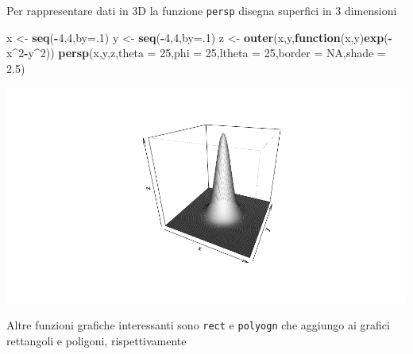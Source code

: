 \documentclass[
  11pt,
]{book}
\newenvironment{Shaded}{\begin{snugshade}}{\end{snugshade}}
\newcommand{\AttributeTok}[1]{\textcolor[rgb]{0.13,0.29,0.53}{#1}}
\newcommand{\ConstantTok}[1]{\textcolor[rgb]{0.56,0.35,0.01}{#1}}
\newcommand{\ControlFlowTok}[1]{\textcolor[rgb]{0.13,0.29,0.53}{\textbf{#1}}}
\newcommand{\DecValTok}[1]{\textcolor[rgb]{0.00,0.00,0.81}{#1}}
\newcommand{\FloatTok}[1]{\textcolor[rgb]{0.00,0.00,0.81}{#1}}
\newcommand{\FunctionTok}[1]{\textcolor[rgb]{0.13,0.29,0.53}{\textbf{#1}}}
\newcommand{\NormalTok}[1]{#1}
\newcommand{\OtherTok}[1]{\textcolor[rgb]{0.56,0.35,0.01}{#1}}
\newcommand{\SpecialCharTok}[1]{\textcolor[rgb]{0.81,0.36,0.00}{\textbf{#1}}}
\theoremstyle{mytheoremstyle}
\theoremstyle{mydefstyle}
\begin{document}
Per rappresentare dati in 3D la funzione \texttt{persp} disegna superfici in 3 dimensioni

\begin{Shaded}
\begin{Highlighting}[]
\NormalTok{x }\OtherTok{\textless{}{-}} \FunctionTok{seq}\NormalTok{(}\SpecialCharTok{{-}}\DecValTok{4}\NormalTok{,}\DecValTok{4}\NormalTok{,}\AttributeTok{by=}\NormalTok{.}\DecValTok{1}\NormalTok{)}
\NormalTok{y }\OtherTok{\textless{}{-}} \FunctionTok{seq}\NormalTok{(}\SpecialCharTok{{-}}\DecValTok{4}\NormalTok{,}\DecValTok{4}\NormalTok{,}\AttributeTok{by=}\NormalTok{.}\DecValTok{1}\NormalTok{)}
\NormalTok{z }\OtherTok{\textless{}{-}} \FunctionTok{outer}\NormalTok{(x,y,}\ControlFlowTok{function}\NormalTok{(x,y)}\FunctionTok{exp}\NormalTok{(}\SpecialCharTok{{-}}\NormalTok{x}\SpecialCharTok{\^{}}\DecValTok{2}\SpecialCharTok{{-}}\NormalTok{y}\SpecialCharTok{\^{}}\DecValTok{2}\NormalTok{))}
\FunctionTok{persp}\NormalTok{(x,y,z,}\AttributeTok{theta =} \DecValTok{25}\NormalTok{,}\AttributeTok{phi =} \DecValTok{25}\NormalTok{,}\AttributeTok{ltheta =} \DecValTok{25}\NormalTok{,}\AttributeTok{border =} \ConstantTok{NA}\NormalTok{,}\AttributeTok{shade =} \FloatTok{2.5}\NormalTok{)}
\end{Highlighting}
\end{Shaded}

\begin{center}\includegraphics{Appunti_di_Statistica_2025_files/figure-latex/24-Libro-28-1} \end{center}

Altre funzioni grafiche interessanti sono \texttt{rect} e \texttt{polyogn}
che aggiungo ai grafici rettangoli e poligoni, rispettivamente
\end{document}
